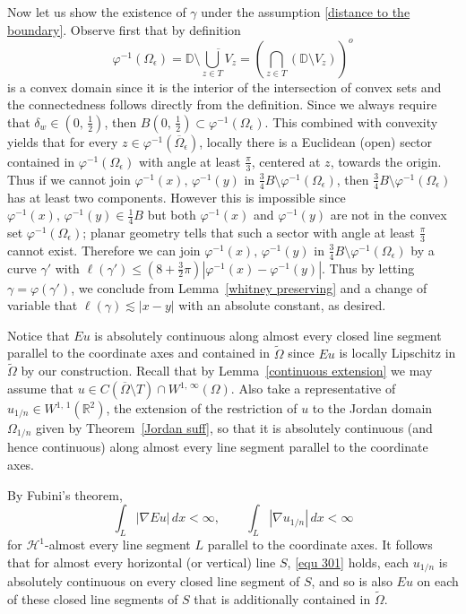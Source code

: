 \documentclass[reqno,11pt]{amsart}
\def\ch{{\mathcal H}}
\def\ez{\epsilon}
\def\wz{\widetilde}
\def\ls{\lesssim}
\numberwithin{equation}{section}
\theoremstyle{remark}
\begin{document}
Now let us show the existence of $\gamma$ under the assumption \eqref{distance to the boundary}. Observe first that by  definition  
$$\varphi^{-1}(\Omega_\epsilon)=  \mathbb D \setminus \overline{\bigcup_{z \in T}V_z} = \left(\bigcap_{z\in T} \left( \mathbb D \setminus V_z \right)\right)^o$$
is a convex domain since it is the interior of the intersection of convex sets and the connectedness follows directly from the definition. Since we always require that $\delta_w \in (0,\,\frac 1 2 )$, then $B(0,\,\frac 1 2)\subset \varphi^{-1}(\Omega_\ez)$. This combined with convexity yields that for every $z\in \varphi^{-1}(\overline{\Omega}_\ez)$, locally there is a Euclidean (open) sector contained in $\varphi^{-1}(\Omega_\ez)$ with angle at least  $\frac \pi 3$, centered at $z$, towards the origin. 
Thus if we cannot join $\varphi^{-1}(x),\,\varphi^{-1}(y)$ in $\frac 3 4 B\setminus\varphi^{-1}(\Omega_\ez)$, then $\frac 3 4 B\setminus\varphi^{-1}(\Omega_\ez)$ has at least two components. However  this is impossible since $\varphi^{-1}(x),\,\varphi^{-1}(y) \in \frac 1 4 B$ but both $\varphi^{-1}(x)$ and $\varphi^{-1}(y)$ are not in the convex set $\varphi^{-1}(\Omega_\ez)$; planar geometry tells that such a sector with angle at least  $\frac \pi 3$ cannot exist. Therefore we can join $\varphi^{-1}(x),\,\varphi^{-1}(y)$ in $\frac 3 4 B\setminus\varphi^{-1}(\Omega_\ez)$ by a curve $\gamma'$ with $\ell(\gamma')\le (8+\frac 3 2  \pi)|\varphi^{-1}(x)-\varphi^{-1}(y)|$. Thus by letting $\gamma=\varphi(\gamma')$, we conclude  from Lemma~\ref{whitney preserving} and a change of variable that $\ell(\gamma)\ls |x-y|$ with an absolute constant, as desired. 


Notice that $Eu$ is absolutely continuous along almost 
every closed line segment  parallel to the coordinate axes and contained in $\wz \Omega$ since $Eu$ is locally Lipschitz in $\wz\Omega$ by our construction. Recall that by
Lemma~\ref{continuous extension} we may assume that 
$u\in C(\overline{\Omega}\setminus T)\cap W^{1,\,\infty}(\Omega)$. 
Also take a representative of $u_{1/n}\in W^{1,\,1}(\mathbb R^2)$, the extension of the restriction of $u$ to the Jordan domain $\Omega_{1/n}$ given by Theorem~\ref{Jordan suff}, so that it is absolutely continuous (and hence continuous)
along  almost every line segment parallel to the coordinate axes.


By  Fubini's theorem, 
\begin{equation}\label{equ 301}
\int_{L} |\nabla Eu|\, dx <\infty, \qquad \int_{L} |\nabla u_{1/n}|\, dx <\infty
\end{equation}
for $\ch^1$-almost every line segment $L$ parallel to the coordinate axes. It follows that for almost every horizontal (or vertical) line $S$, \eqref{equ 301} holds, each $u_{1/n}$ is absolutely continuous on every closed line segment of $S$, and so is also $Eu$ on each of these closed line segments of $S$ that is additionally contained in $\wz \Omega$. 
\end{document}
